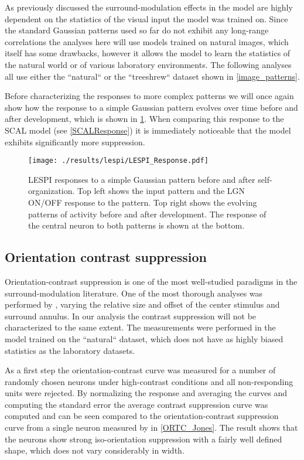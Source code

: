 As previously discussed the surround-modulation effects in the model
are highly dependent on the statistics of the visual input the model
was trained on. Since the standard Gaussian patterns used so far do
not exhibit any long-range correlations the analyses here will use
models trained on natural images, which itself has some drawbacks,
however it allows the model to learn the statistics of the natural
world or of various laboratory environments. The following analyses
all use either the ``natural`` or the ``treeshrew`` dataset shown in
\ref{image_patterns}.

Before characterizing the responses to more complex patterns we will
once again show how the response to a simple Gaussian pattern evolves
over time before and after development, which is shown in
\ref{LESPIResponse}. When comparing this response to the SCAL model
(see \ref{SCALResponse}) it is immediately noticeable that the model
exhibits significantly more suppression.

\begin{figure}
	\centering
    \texttt{[image: ./results/lespi/LESPI\_Response.pdf]}
	\caption[LEPSI responses to a simple Gaussian pattern before and
      after self-organization.]{LESPI responses to a simple Gaussian
      pattern before and after self-organization. Top left shows the
      input pattern and the LGN ON/OFF response to the pattern. Top
      right shows the evolving patterns of activity before and after
      development. The response of the central neuron to both patterns
      is shown at the bottom.}
	\label{LESPIResponse}
\end{figure}

\subsection{Orientation contrast suppression}

Orientation-contrast suppression is one of the most well-studied
paradigms in the surround-modulation literature. One of the most
thorough analyses was performed by \cite{Jones2002}, varying the
relative size and offset of the center stimulus and surround
annulus. In our analysis the contrast suppression will not be
characterized to the same extent. The measurements were performed in
the model trained on the ``natural`` dataset, which does not have as
highly biased statistics as the laboratory datasets.

As a first step the orientation-contrast curve was measured for a
number of randomly chosen neurons under high-contrast conditions and
all non-responding units were rejected. By normalizing the response
and averaging the curves and computing the standard error the average
contrast suppression curve was computed and can be seen compared to
the orientation-contrast suppression curve from a single neuron
measured by \cite{Jones2002} in \ref{ORTC_Jones}. The result shows
that the neurons show strong iso-orientation suppression with a fairly
well defined shape, which does not vary considerably in width.

